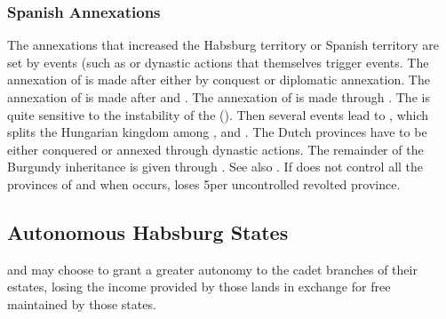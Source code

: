 \subsubsection{Spanish Annexations}
\aparag The annexations that increased the Habsburg territory or Spanish
territory are set by events (such as  or dynastic actions that themselves trigger events.
\aparag[Italy] The annexation of  is made after
 either by conquest or diplomatic
annexation. The annexation of  is made after
 and .
\aparag[Bohemia] The annexation of  is made through
.
\aparag[Hungary] The  is quite sensitive to the
instability of the  (). Then
several events lead to , which splits the
Hungarian kingdom among \POL, \TUR and \HAB.
 The Dutch provinces have to be either conquered
or annexed through dynastic actions. The remainder of the Burgundy
inheritance is given through . See
also .
\bparag If \HAB does not control all the provinces of 
and  when  occurs, \HAB loses
5\VP per uncontrolled revolted province.



\subsection{Autonomous Habsburg States}\label{chSpecific:Spain:Autonomous
  States}

\begin{designnote}
  \AUS and \SPA may choose to grant a greater autonomy to the cadet
  branches of their estates, losing the income provided by those lands
  in exchange for free  maintained by those states.
\end{designnote}


